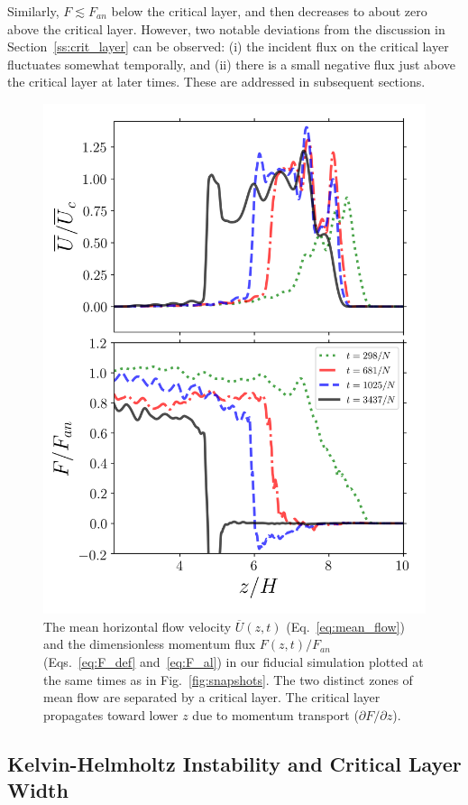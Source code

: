 \documentclass[
        fleqn,
        usenatbib,
    ]{mnras}
\newcommand*{\pdil}[2]{\partial#1/\partial#2}
\begin{document}
Similarly, $F \lesssim F_{an}$ below the critical layer, and then decreases to
about zero above the critical layer. However, two notable deviations from the
discussion in Section~\ref{ss:crit_layer} can be observed: (i) the incident flux
on the critical layer fluctuates somewhat temporally, and (ii) there is a small
negative flux just above the critical layer at later times. These are addressed
in subsequent sections.
\begin{figure}
    \centering
    \includegraphics[width=0.9\columnwidth]{plots/nl_fluxes.png}
    \caption{The mean horizontal flow velocity $\overline{U}(z, t)$
    (Eq.~\eqref{eq:mean_flow}) and the dimensionless momentum flux $F(z, t) /
    F_{an}$ (Eqs.~\eqref{eq:F_def} and~\eqref{eq:F_al}) in our fiducial
    simulation plotted at the same times as in Fig.~\ref{fig:snapshots}. The two
    distinct zones of mean flow are separated by a critical layer. The critical
    layer propagates toward lower $z$ due to momentum transport
    ($\pdil{F}{z}$).}\label{fig:nl_fluxes}
\end{figure}

\subsection{Kelvin-Helmholtz Instability and Critical Layer Width}\label{ss:khi}
\end{document}
